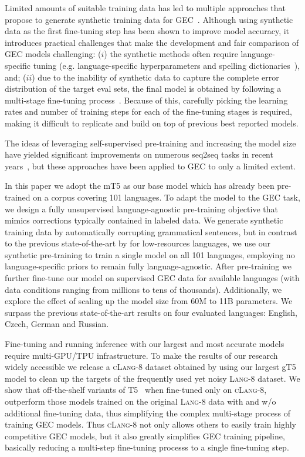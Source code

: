 \documentclass[11pt,a4paper]{article}
\newcommand{\GT}[0]{{gT5}\xspace}
\newcommand{\lang}[0]{{\scshape Lang-8}\xspace}
\newcommand{\clangg}[0]{{\scshape cLang-8}\xspace}
\begin{document}
Limited amounts of suitable training data has led to multiple approaches that propose to generate synthetic training data for GEC~\cite{madnani2012exploring,grundkiewicz2014wiked,grundkiewicz-etal-2019-neural,lichtarge-etal-2019-corpora,awasthi-etal-2019-parallel}.
Although using synthetic data as the first fine-tuning step has been shown to improve model accuracy, it introduces practical challenges that make the development and fair comparison of GEC models challenging: ($i$) the synthetic methods often require language-specific tuning (e.g. language-specific hyperparameters and spelling dictionaries~\cite{naplava}), and; ($ii$) due to the inability of synthetic data to capture the complete error distribution of the target eval sets, the final model is obtained by following a multi-stage fine-tuning process~\cite{lichtarge-etal-2019-corpora,lichtarge-etal-2020-data,omelianchuk-etal-2020-gector}. 
Because of this, carefully picking the learning rates and number of training steps for each of the fine-tuning stages is required, making it difficult to replicate and build on top of previous best reported models.

The ideas of leveraging self-supervised pre-training and increasing the model size have yielded significant improvements on numerous seq2seq tasks in recent years~\cite{t5,mt5,BART,MASS,KERMIT,Bert2Bert}, but these approaches have been applied to GEC to only a limited extent.

In this paper we adopt the mT5 \citep{mt5} as our base model which has already been pre-trained on a corpus covering 101 languages.
To adapt the model to the GEC task, we design a fully unsupervised language-agnostic pre-training objective that mimics corrections typically contained in labeled data.
We generate synthetic training data by automatically corrupting grammatical sentences, but in contrast to the previous state-of-the-art by \citet{naplava} for low-resources languages, we use our synthetic pre-training to train a single model on all 101 languages, employing no language-specific priors to remain fully language-agnostic.  After pre-training we further fine-tune our model on supervised GEC data for available languages (with data conditions ranging from millions to tens of thousands).
Additionally, we explore the effect of scaling up the model size from 60M to 11B parameters. We surpass the previous state-of-the-art results on four evaluated languages: English, Czech, German and Russian.

Fine-tuning and running inference with our largest and most accurate models require multi-GPU/TPU infrastructure. To make the results of our research widely accessible we release a \clangg dataset obtained by using our largest \GT model to clean up the targets of the frequently used yet noisy \lang dataset. We show that off-the-shelf variants of T5~\cite{t5} when fine-tuned only on \clangg, outperform those models trained on the original \lang data with and w/o additional fine-tuning data, thus simplifying the complex multi-stage process of training GEC models. Thus \clangg not only allows others to easily train highly competitive GEC models, but it also greatly simplifies GEC training pipeline, basically reducing a multi-step fine-tuning processs to a single fine-tuning step.
\end{document}
